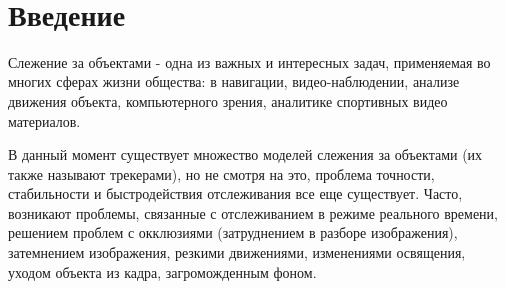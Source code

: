 \documentclass[14pt, a4paper]{article}
\begin{document}




 
     
    \tableofcontents %
 
\newpage
\section*{Введение}

Слежение за объектами  - одна из важных и интересных задач, применяемая во многих сферах жизни общества: в навигации, видео-наблюдении, анализе движения объекта, компьютерного зрения, аналитике спортивных видео материалов.  

В данный момент существует множество моделей слежения за объектами (их также называют трекерами), но не смотря на это, проблема точности, стабильности и быстродействия отслеживания все еще существует. Часто, возникают проблемы, связанные с отслеживанием в режиме реального времени, решением проблем с окклюзиями (затруднением в разборе изображения), затемнением изображения, резкими движениями, изменениями освящения, уходом объекта из кадра, загроможденным фоном.
\end{document}
